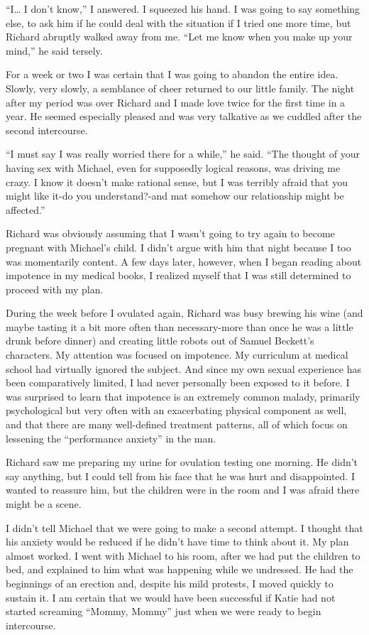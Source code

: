\documentclass[]{article}
\begin{document}
“I… I don’t know,” I answered. I squeezed his hand. I was going to say something else, to ask him if he could deal with the situation if I tried one more time, but Richard abruptly walked away from me. “Let me know when you make up your mind,” he said tersely.

For a week or two I was certain that I was going to abandon the entire idea. Slowly, very slowly, a semblance of cheer returned to our little family. The night after my period was over Richard and I made love twice for the first time in a year. He seemed especially pleased and was very talkative as we cuddled after the second intercourse.

“I must say I was really worried there for a while,” he said. “The thought of your having sex with Michael, even for supposedly logical reasons, was driving me crazy. I know it doesn’t make rational sense, but I was terribly afraid that you might like it-do you understand?-and mat somehow our relationship might be affected.”

Richard was obviously assuming that I wasn’t going to try again to become pregnant with Michael’s child. I didn’t argue with him that night because I too was momentarily content. A few days later, however, when I began reading about impotence in my medical books, I realized myself that I was still determined to proceed with my plan.

During the week before I ovulated again, Richard was busy brewing his wine (and maybe tasting it a bit more often than necessary-more than once he was a little drunk before dinner) and creating little robots out of Samuel Beckett’s characters. My attention was focused on impotence. My curriculum at medical school had virtually ignored the subject. And since my own sexual experience has been comparatively limited, I had never personally been exposed to it before. I was surprised to learn that impotence is an extremely common malady, primarily psychological but very often with an exacerbating physical component as well, and that there are many well-defined treatment patterns, all of which focus on lessening the “performance anxiety” in the man.

Richard saw me preparing my urine for ovulation testing one morning. He didn’t say anything, but I could tell from his face that he was hurt and disappointed. I wanted to reassure him, but the children were in the room and I was afraid there might be a scene.

I didn’t tell Michael that we were going to make a second attempt. I thought that his anxiety would be reduced if he didn’t have time to think about it. My plan almost worked. I went with Michael to his room, after we had put the children to bed, and explained to him what was happening while we undressed. He had the beginnings of an erection and, despite his mild protests, I moved quickly to sustain it. I am certain that we would have been successful if Katie had not started screaming “Mommy, Mommy” just when we were ready to begin intercourse.
\end{document}
